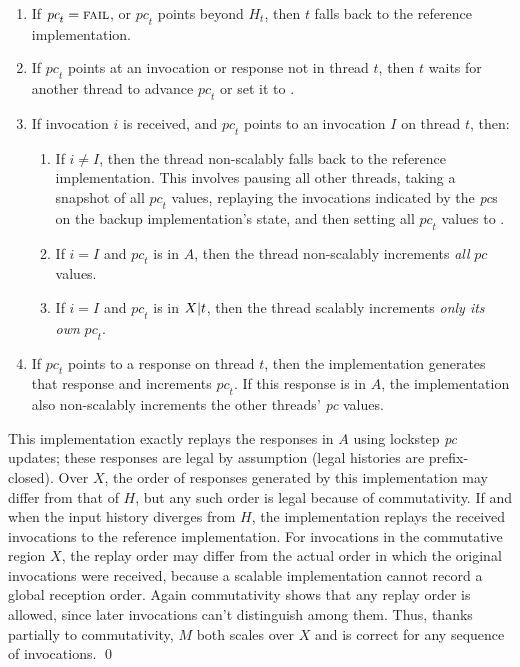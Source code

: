   \begin{enumerate}
\item If $\textit{pc}_t = \textsc{fail}$, or $\textit{pc}_t$ points beyond
  $H_t$, then $t$ falls back to the reference implementation.
\item If $\textit{pc}_t$ points at an invocation or response not in
  thread $t$, then $t$ waits for another thread to advance
  $\textit{pc}_t$ or set it to \FAIL.
\item If invocation $i$ is received, and $\textit{pc}_t$ points to an
  invocation $I$ on thread $t$, then:
  \begin{enumerate}
\item If $i \neq I$, then the thread non-scalably falls back to the
  reference implementation. This involves pausing all other threads, taking
  a snapshot of all $\textit{pc}_t$ values, replaying the
  invocations indicated by the \textit{pc}s on the backup
  implementation's state, and then setting all $\textit{pc}_t$ values to
  \FAIL.
\item If $i = I$ and $\textit{pc}_t$ is in $A$, then the thread
  non-scalably increments \emph{all} $\textit{pc}$ values.
\item If $i = I$ and $\textit{pc}_t$ is in $X|t$, then the
  thread scalably increments \emph{only its own} $\textit{pc}_t$.
  \end{enumerate}
\item If $\textit{pc}_t$ points to a response on thread $t$, then the
  implementation generates that response and increments $\textit{pc}_t$.
  If this response is in $A$, the implementation also
  non-scalably increments the other threads' \textit{pc} values.
\end{enumerate}

\noindent
%
This implementation
%
exactly replays the responses in $A$ using lockstep \textit{pc}
updates; these responses are legal by assumption (legal histories are
prefix-closed).
%
Over $X$, the order of responses generated by this implementation may
differ from that of $H$, but any such order is legal because of
commutativity.
%
If and when the input history diverges from $H$, the implementation
replays the received invocations to the reference implementation.
%
For invocations in the commutative region $X$, the replay order may
differ from the actual order in which the original invocations were received, because a scalable
implementation cannot record a global reception order.
%
Again commutativity shows that any replay order is allowed, since later
invocations can't distinguish among them.
%
Thus, thanks partially to commutativity, $M$ both scales over $X$ and is
correct for any sequence of invocations. \qed

